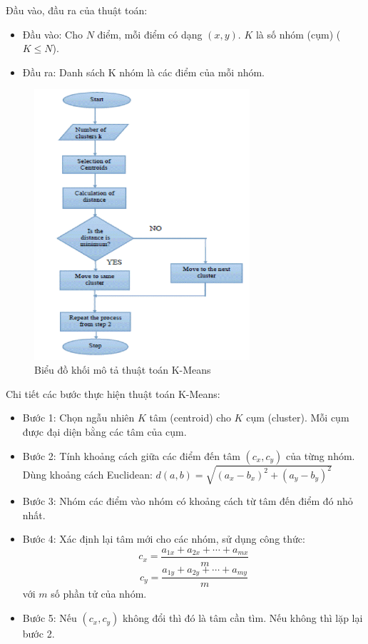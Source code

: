 Đầu vào, đầu ra của thuật toán:
\begin{itemize}[topsep=0ex]
\item Đầu vào: Cho $N$ điểm, mỗi điểm có 
    dạng $(x, y)$. $K$ là số nhóm (cụm) ($K \le N$).
\item Đầu ra: Danh sách K nhóm là các điểm của mỗi nhóm.
\end{itemize}
\begin{figure}[H]
    \centering
    \includegraphics[width=8cm]{images/k-means-flow.png}
    \caption{Biểu đồ khối mô tả thuật toán K-Means}
\end{figure}

Chi tiết các bước thực hiện thuật toán K-Means:
\begin{itemize}[topsep=0ex]
\item Bước 1: Chọn ngẫu nhiên $K$ tâm (centroid) cho $K$ cụm (cluster).
    Mỗi cụm được đại diện bằng các tâm của cụm.

\item Bước 2: Tính khoảng cách giữa các điểm đến tâm $(c_x, c_y)$
    của từng nhóm.
    Dùng khoảng cách Euclidean: 
    $d(a, b) = \sqrt{(a_x - b_x)^2 + (a_y - b_y)^ 2}$

\item Bước 3: Nhóm các điểm vào nhóm có khoảng cách từ tâm
    đến điểm đó nhỏ nhất.

\item Bước 4: Xác định lại tâm mới cho các nhóm, sử dụng công thức:
    $$
    c_x = \frac{a_{1x} + a_{2x} + \cdots + a_{mx}}{m}
    $$
    $$
    c_y = \frac{a_{1y} + a_{2y} + \cdots + a_{my}}{m}
    $$
    với $m$ số phần tử của nhóm.

\item Bước 5: Nếu $(c_x, c_y)$ không đổi thì đó là tâm cần tìm.
    Nếu không thì lặp lại bước 2.
\end{itemize}

